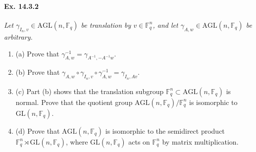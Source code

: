 \documentclass[11pt,a4paper]{article}
\newcommand{\be} {\begin{enumerate}}
\newcommand{\ee} {\end{enumerate}}
\newcommand{\F}{\mathbb{F}}
\begin{document}
 \paragraph{Ex. 14.3.2}
 {\it Let $\gamma_{I_n,v} \in \mathrm{AGL}(n,\F_q)$ be translation by $v \in \F_{q}^n$, and let $\gamma_{A,w} \in \mathrm{AGL}(n,\F_q)$ be arbitrary.}
 \be
 \item[(a)] Prove that $\gamma_{A,w}^{-1} = \gamma_{A^{-1},-A^{-1}w}$.
 \item[(b)] Prove that $\gamma_{A,w} \circ \gamma_{I_n,v} \circ \gamma_{A,w}^{-1} = \gamma_{I_n,Av}$.
 \item[(c)] Part (b) shows that the translation subgroup $\F_q^n \subset \mathrm{AGL}(n,\F_q)$ is normal. Prove that the quotient group $\mathrm{AGL}(n,\F_q)/\F_q^n$ is isomorphic to $\mathrm{GL}(n,\F_q)$.
 \item[(d)] Prove that $\mathrm{AGL}(n,\F_q)$ is isomorphic to the semidirect product $\F_q^n \rtimes \mathrm{GL}(n,\F_q)$, where $\mathrm{GL}(n,\F_q)$ acts on $\F_q^n$ by matrix multiplication.
 \ee
 
\end{document}
